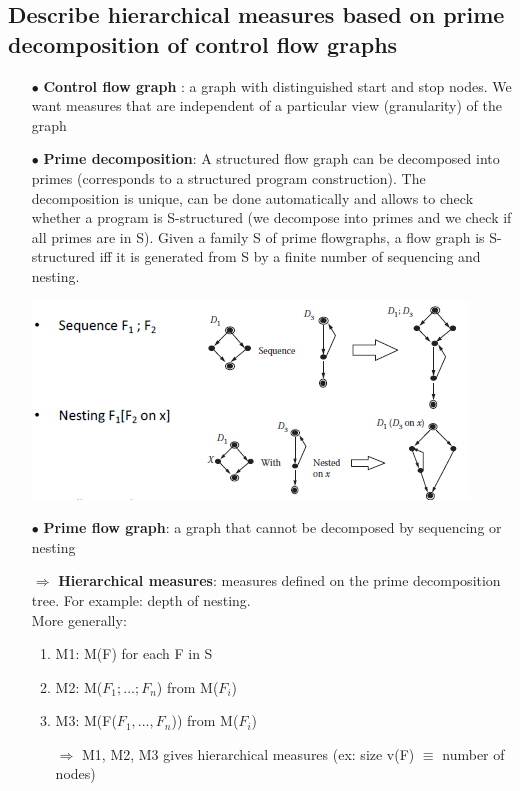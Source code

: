 \documentclass{article}
\begin{document}
\subsection{Describe hierarchical measures based on prime decomposition of control flow graphs}
\begin{itemize}
    \item [$\bullet$]\textbf{Control flow graph} : a graph with distinguished start and stop nodes. We want measures that are
independent of a particular view (granularity) of the graph\\

    \item [$\bullet$]\textbf{Prime decomposition}: A structured flow graph can be decomposed into primes (corresponds to a structured program construction). The decomposition is unique, can be done automatically and allows to check whether a program is S-structured (we decompose into primes and we check if all primes are in S).
    Given a family S of prime flowgraphs, a flow graph is S-structured iff it is generated from S by a finite number of sequencing and nesting.

\begin{center}
        \includegraphics[scale=0.6]{image/31.PNG}
\end{center}

    \item [$\bullet$]\textbf{Prime flow graph}: a graph that cannot be decomposed by sequencing or nesting\\
    \item [$\Rightarrow$]\textbf{Hierarchical measures}: measures defined on the prime decomposition tree. For example: depth of nesting. \\
    More generally:
    \begin{enumerate}
        \item M1: M(F) for each F in S
        \item M2: M($F_1;...;F_n$) from M($F_i$)
        \item M3: M(F($F_1,...,F_n$)) from M($F_i$)
        \item [$\Rightarrow$] M1, M2, M3 gives hierarchical measures (ex: size v(F) $\equiv$ number of nodes)
    \end{enumerate}
\end{itemize}
\newpage
\end{document}
